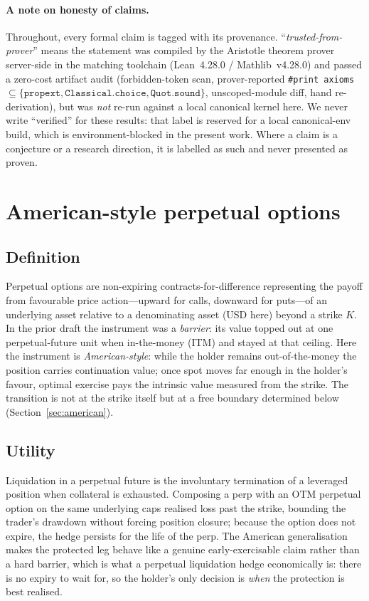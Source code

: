 \documentclass[11pt]{article}
\newcommand{\tfp}{\emph{trusted-from-prover}}
\begin{document}
\paragraph{A note on honesty of claims.}
Throughout, every formal claim is tagged with its provenance. ``\tfp{}'' means
the statement was compiled by the Aristotle theorem prover server-side in the
matching toolchain (Lean~4.28.0 / Mathlib~v4.28.0) and passed a zero-cost
artifact audit (forbidden-token scan, prover-reported \texttt{\#print axioms}
$\subseteq\{\texttt{propext},\texttt{Classical.choice},\texttt{Quot.sound}\}$,
unscoped-module diff, hand re-derivation), but was \emph{not} re-run against a
local canonical kernel here. We never write ``verified'' for these results: that
label is reserved for a local canonical-env build, which is environment-blocked
in the present work. Where a claim is a conjecture or a research direction, it is
labelled as such and never presented as proven.

\section{American-style perpetual options}\label{sec:perp}

\subsection{Definition}
Perpetual options are non-expiring contracts-for-difference representing the
payoff from favourable price action---upward for calls, downward for
puts---of an underlying asset relative to a denominating asset (USD here)
beyond a strike $K$. In the prior draft the instrument was a \emph{barrier}: its
value topped out at one perpetual-future unit when in-the-money (ITM) and stayed
at that ceiling. Here the instrument is \emph{American-style}: while the holder
remains out-of-the-money the position carries continuation value; once spot moves
far enough in the holder's favour, optimal exercise pays the intrinsic value
measured from the strike. The transition is not at the strike itself but at a
free boundary determined below (Section~\ref{sec:american}).

\subsection{Utility}
Liquidation in a perpetual future is the involuntary termination of a leveraged
position when collateral is exhausted. Composing a perp with an OTM perpetual
option on the same underlying caps realised loss past the strike, bounding the
trader's drawdown without forcing position closure; because the option does not
expire, the hedge persists for the life of the perp. The American generalisation
makes the protected leg behave like a genuine early-exercisable claim rather than
a hard barrier, which is what a perpetual liquidation hedge economically is:
there is no expiry to wait for, so the holder's only decision is \emph{when} the
protection is best realised.
\end{document}
